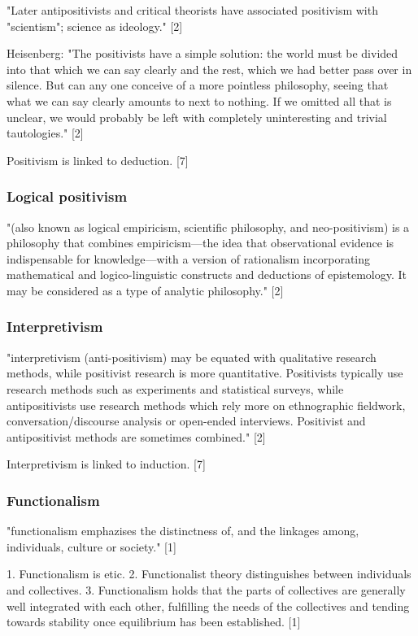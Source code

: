 "Later antipositivists and critical theorists have associated positivism with "scientism"; science as ideology." [2]

Heisenberg: "The positivists have a simple solution: the world must be divided into that which we can say clearly and the rest, which we had better pass over in silence. But can any one conceive of a more pointless philosophy, seeing that what we can say clearly amounts to next to nothing. If we omitted all that is unclear, we would probably be left with completely uninteresting and trivial tautologies." [2]

Positivism is linked to deduction. [7]

\subsubsection{Logical positivism}

"(also known as logical empiricism, scientific philosophy, and neo-positivism)
is a philosophy that combines empiricism—the idea that observational evidence is indispensable for knowledge—with a version of rationalism incorporating mathematical and logico-linguistic constructs and deductions of epistemology. It may be considered as a type of analytic philosophy." [2]

\subsubsection{Interpretivism}

"interpretivism (anti-positivism) may be equated with qualitative research methods, while positivist research is more quantitative. Positivists typically use research methods such as experiments and statistical surveys, while antipositivists use research methods which rely more on ethnographic fieldwork, conversation/discourse analysis or open-ended interviews. Positivist and antipositivist methods are sometimes combined." [2]

Interpretivism is linked to induction. [7]

\subsubsection{Functionalism}

"functionalism emphazises the distinctness of, and the linkages among, individuals, culture or society." [1]

1.	Functionalism is etic.
2.	Functionalist theory distinguishes between individuals and collectives.
3.	Functionalism holds that the parts of collectives are generally well integrated with each other, fulfilling the needs of the collectives and tending towards stability once equilibrium has been established. [1]

